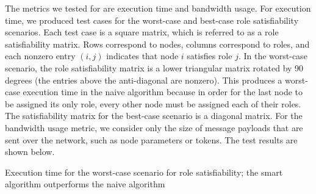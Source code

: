 \documentclass[11pt]{article}
\makeatletter
\newenvironment{figurehere}
{\def\@captype{figure}}
{}
\makeatother
\begin{document}
\begin{multicols}{2}
The metrics we tested for are execution time and bandwidth usage. For execution time, we produced test cases for the worst-case and best-case role satisfiability scenarios. Each test case is a square matrix, which is referred to as a role satisfiability matrix. Rows correspond to nodes, columns correspond to roles, and each nonzero entry $(i, j)$ indicates that node $i$ satisfies role $j$. In the worst-case scenario, the role satisfiability matrix is a lower triangular matrix rotated by 90 degrees (the entries above the anti-diagonal are nonzero). This produces a worst-case execution time in the naive algorithm because in order for the last node to be assigned its only role, every other node must be assigned each of their roles. The satisfiability matrix for the best-case scenario is a diagonal matrix. For the bandwidth usage metric, we consider only the size of message payloads that are sent over the network, such as node parameters or tokens. The test results are shown below.

\begin{figurehere}
\centering
{}
\caption{Execution time for the worst-case scenario for role satisfiability; the smart algorithm outperforms the naive algorithm}
\end{figurehere}
\vspace{.1in}


\end{multicols}
\end{document}
